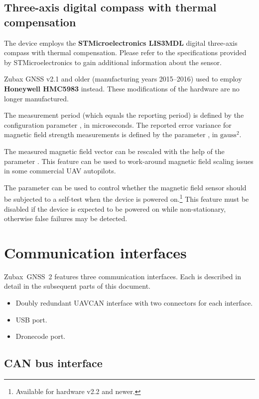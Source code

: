 \documentclass{zubaxdoc}
\begin{document}
\subsection{Three-axis digital compass with thermal compensation}

The device employs the \textbf{STMicroelectronics LIS3MDL} digital three-axis compass with thermal compensation.
Please refer to the specifications provided by STMicroelectronics to gain additional information about the sensor.

Zubax GNSS v2.1 and older (manufacturing years 2015--2016) used to employ \textbf{Honeywell HMC5983} instead.
These modifications of the hardware are no longer manufactured.

The measurement period (which equals the reporting period) is defined by the configuration parameter 
, in microseconds.
The reported error variance for magnetic field strength measurements is defined by the parameter
, in $\text{gauss}^2$.

The measured magnetic field vector can be rescaled with the help of the parameter .
This feature can be used to work-around magnetic field scaling issues in some commercial UAV autopilots.

The parameter  can be used to control whether the magnetic field sensor should be
subjected to a self-test when the device is powered on.\footnote{Available for hardware v2.2 and newer.}
This feature must be disabled if the device is expected to be powered on while non-stationary,
otherwise false failures may be detected.

\section{Communication interfaces}

Zubax~GNSS~2 features three communication interfaces. Each is described in detail in the subsequent parts of this document.
\begin {itemize}
\item Doubly redundant UAVCAN interface with two connectors for each interface.
\item USB port.
\item Dronecode port.
\end{itemize}

\subsection{CAN bus interface}
\end{document}
